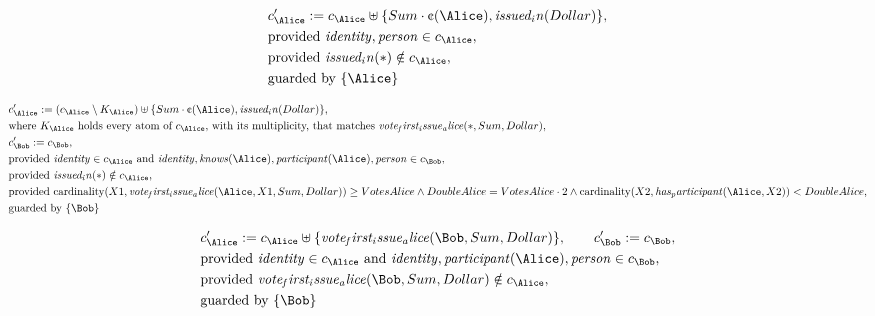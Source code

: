 \begin{align*}
&
c'_
{
\Alice
}
 := 
c_
{
\Alice
}
 \uplus 
\{
Sum
\cdot
\text{\textcent}
(
\Alice
)
,
\mathit{
issued_in
}
(
Dollar
)
\}
,\\
&
\text{provided } 
\mathit{
identity
}
,
\mathit{
person
}
 \in c_
{
\Alice
}
,\\
&
\text{provided } 
\mathit{
issued_in
}
(
\ast
)
 \notin c_
{
\Alice
}
,\\
&
\text{guarded by } \{
\Alice
\}
\end{align*}

\begin{align*}
&
c'_
{
\Alice
}
 := 
(
c_
{
\Alice
}
 \setminus K_
{
\Alice
}
) \uplus 
\{
Sum
\cdot
\text{\textcent}
(
\Alice
)
,
\mathit{
issued_in
}
(
Dollar
)
\}
,\\
&
\text{where } K_
{
\Alice
}
 \text{ holds every atom of } c_
{
\Alice
}
 \text{, with its multiplicity, that matches } 
\mathit{
vote_first_issue_alice
}
(
\ast
,
Sum
,
Dollar
)
,\\
&
c'_
{
\Bob
}
 := 
c_
{
\Bob
}
,\\
&
\text{provided } 
\mathit{
identity
}
 \in c_
{
\Alice
}
 \text{ and } 
\mathit{
identity
}
,
\mathit{
knows
}
(
\Alice
)
,
\mathit{
participant
}
(
\Alice
)
,
\mathit{
person
}
 \in c_
{
\Bob
}
,\\
&
\text{provided } 
\mathit{
issued_in
}
(
\ast
)
 \notin c_
{
\Alice
}
,\\
&
\text{provided } 
\mathrm{cardinality}(
X1
,
\mathit{
vote_first_issue_alice
}
(
\Alice
,
X1
,
Sum
,
Dollar
)
)
\ge
VotesAlice
\land
DoubleAlice
=
VotesAlice
\cdot
2
\land
\mathrm{cardinality}(
X2
,
\mathit{
has_participant
}
(
\Alice
,
X2
)
)
<
DoubleAlice
,\\
&
\text{guarded by } \{
\Bob
\}
\end{align*}

\begin{align*}
&
c'_
{
\Alice
}
 := 
c_
{
\Alice
}
 \uplus 
\{
\mathit{
vote_first_issue_alice
}
(
\Bob
,
Sum
,
Dollar
)
\}
, \qquad 
c'_
{
\Bob
}
 := 
c_
{
\Bob
}
,\\
&
\text{provided } 
\mathit{
identity
}
 \in c_
{
\Alice
}
 \text{ and } 
\mathit{
identity
}
,
\mathit{
participant
}
(
\Alice
)
,
\mathit{
person
}
 \in c_
{
\Bob
}
,\\
&
\text{provided } 
\mathit{
vote_first_issue_alice
}
(
\Bob
,
Sum
,
Dollar
)
 \notin c_
{
\Alice
}
,\\
&
\text{guarded by } \{
\Bob
\}
\end{align*}

